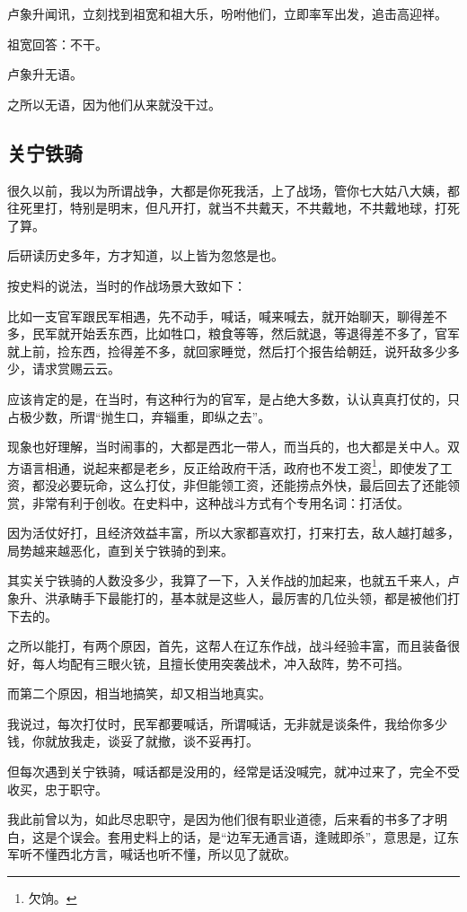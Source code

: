 \begin{multicols}{\theparacolNo}
		卢象升闻讯，立刻找到祖宽和祖大乐，吩咐他们，立即率军出发，追击高迎祥。

		祖宽回答：不干。

		卢象升无语。

		之所以无语，因为他们从来就没干过。

		\subsection{关宁铁骑}
		很久以前，我以为所谓战争，大都是你死我活，上了战场，管你七大姑八大姨，都往死里打，特别是明末，但凡开打，就当不共戴天，不共戴地，不共戴地球，打死了算。

		后研读历史多年，方才知道，以上皆为忽悠是也。

		按史料的说法，当时的作战场景大致如下：

		比如一支官军跟民军相遇，先不动手，喊话，喊来喊去，就开始聊天，聊得差不多，民军就开始丢东西，比如牲口，粮食等等，然后就退，等退得差不多了，官军就上前，捡东西，捡得差不多，就回家睡觉，然后打个报告给朝廷，说歼敌多少多少，请求赏赐云云。

		应该肯定的是，在当时，有这种行为的官军，是占绝大多数，认认真真打仗的，只占极少数，所谓“抛生口，弃辎重，即纵之去”。

		现象也好理解，当时闹事的，大都是西北一带人，而当兵的，也大都是关中人。双方语言相通，说起来都是老乡，反正给政府干活，政府也不发工资\footnote{欠饷。}，即使发了工资，都没必要玩命，这么打仗，非但能领工资，还能捞点外快，最后回去了还能领赏，非常有利于创收。在史料中，这种战斗方式有个专用名词：打活仗。

		因为活仗好打，且经济效益丰富，所以大家都喜欢打，打来打去，敌人越打越多，局势越来越恶化，直到关宁铁骑的到来。

		其实关宁铁骑的人数没多少，我算了一下，入关作战的加起来，也就五千来人，卢象升、洪承畴手下最能打的，基本就是这些人，最厉害的几位头领，都是被他们打下去的。

		之所以能打，有两个原因，首先，这帮人在辽东作战，战斗经验丰富，而且装备很好，每人均配有三眼火铳，且擅长使用突袭战术，冲入敌阵，势不可挡。

		而第二个原因，相当地搞笑，却又相当地真实。

		我说过，每次打仗时，民军都要喊话，所谓喊话，无非就是谈条件，我给你多少钱，你就放我走，谈妥了就撤，谈不妥再打。

		但每次遇到关宁铁骑，喊话都是没用的，经常是话没喊完，就冲过来了，完全不受收买，忠于职守。

		我此前曾以为，如此尽忠职守，是因为他们很有职业道德，后来看的书多了才明白，这是个误会。套用史料上的话，是“边军无通言语，逢贼即杀”，意思是，辽东军听不懂西北方言，喊话也听不懂，所以见了就砍。


\end{multicols}
